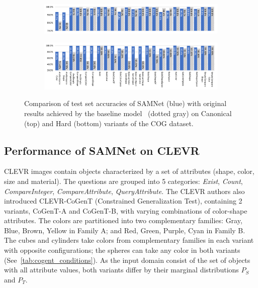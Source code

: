 \begin{figure}[!t]
	\centering
	\begin{subfigure}{\textwidth}
		\centering
		\includegraphics[width=\textwidth]{../img/plots/cog_canonical_baseline_no_labels.pdf}
	\end{subfigure}%
	\newline
	\begin{subfigure}{\textwidth}
		\centering
		\includegraphics[width=\textwidth]{../img/plots/cog_hard_baseline_labels.pdf}
	\end{subfigure}%
	\caption{Comparison of test set accuracies of SAMNet (blue) with original results achieved by the baseline model~\cite{yang2018dataset} (dotted gray) on Canonical (top) and Hard (bottom) variants of the COG dataset.}
	\label{fig:samnet_cog_detailed}\vspace{-10pt}
\end{figure}

\subsection{Performance of SAMNet on CLEVR}
\label{sec:clevr-baseline-compare}
CLEVR images contain objects characterized by a set of attributes (shape, color, size and material). The questions are grouped into 5 categories: \textit{Exist}, \textit{Count}, \textit{CompareInteger}, \textit{CompareAttribute}, \textit{QueryAttribute}.
The CLEVR authors also introduced CLEVR-CoGenT (Constrained Generalization Test), containing 2 variants, CoGenT-A and CoGenT-B, with varying combinations of color-shape attributes.
The colors are partitioned into two complementary families:
Gray, Blue, Brown, Yellow in Family A; and Red, Green, Purple, Cyan in Family B.
The cubes and cylinders take colors from complementary families in each variant with opposite configurations; the spheres can take any color in both variants (See~\cref{tab:cogent_conditions}).
As the input domain consist of the set of objects with all attribute values, both variants differ by their marginal distributions $P_S$ and $P_T$.

